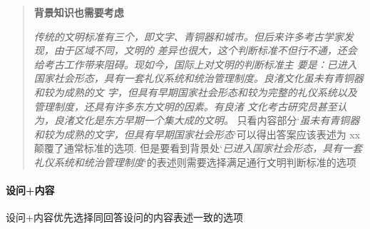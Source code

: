 \begin{quote}
	\textbf{背景知识也需要考虑}
	\begin{tcolorbox}[colback=blue!5, colframe=blue!75!black, title=背景+内容案例]
		\textit{传统的文明标准有三个，即文字、青铜器和城市。但后来许多考古学家发现，由于区域不同，文明的
			差异也很大，这个判断标准不但行不通，还会给考古工作带来阻碍。现如今，国际上对文明的判断标准主
			要是：已进入国家社会形态，具有一套礼仪系统和统治管理制度。良渚文化虽未有青铜器和较为成熟的文
			字，但具有早期国家社会形态和较为完整的礼仪系统以及管理制度，还具有许多东方文明的因素。有良渚
			文化考古研究员甚至认为，良渚文化是东方早期一个集大成的文明。}
		\tcblower%
		只看内容部分`\textit{虽未有青铜器和较为成熟的文字，但具有早期国家社会形态}`可以得出答案应该表述为 xx 颠覆了通常标准的选项. 但是要看到背景处`\textit{已进入国家社会形态，具有一套礼仪系统和统治管理制度}`的表述则需要选择满足通行文明判断标准的选项
	\end{tcolorbox}
\end{quote}

\paragraph{设问+内容} 设问+内容优先选择同回答设问的内容表述一致的选项
